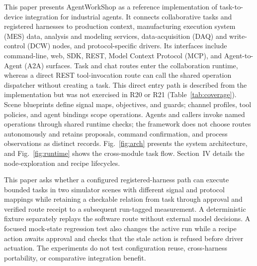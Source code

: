 This paper presents AgentWorkShop as a reference implementation of
task-to-device integration for industrial agents. It connects collaborative tasks
and registered harnesses to production context, manufacturing execution
system (MES) data, analysis and modeling services, data-acquisition (DAQ) and
write-control (DCW) nodes, and protocol-specific drivers. Its interfaces include
command-line, web, SDK, REST, Model Context Protocol (MCP), and Agent-to-Agent
(A2A) surfaces. Task and chat routes enter the
collaboration runtime, whereas a direct REST tool-invocation route can call
the shared operation dispatcher without creating a task. This direct entry
path is described from the implementation but was not exercised in R20 or
R21 (Table~\ref{tab:coverage}).
Scene blueprints define signal maps, objectives, and guards; channel profiles,
tool policies, and agent bindings scope operations. Agents and callers invoke
named operations through shared runtime checks; the framework does not choose
routes autonomously and retains proposals, command confirmation, and process
observations as distinct records. Fig.~\ref{fig:arch} presents the system
architecture, and Fig.~\ref{fig:runtime} shows the cross-module task flow.
Section~IV details the node-exploration and recipe lifecycles.

This paper asks whether a configured registered-harness path can execute
bounded tasks in two simulator scenes with different signal and protocol
mappings while retaining a checkable relation from task through approval and
verified route receipt to a subsequent run-tagged measurement. A deterministic
fixture separately replays the software route without external model
decisions. A focused mock-state regression test also changes the active run
while a recipe action awaits approval and checks that the stale action is
refused before driver actuation. The experiments do not test configuration
reuse, cross-harness portability, or comparative integration benefit.

